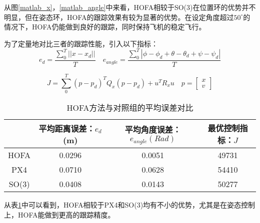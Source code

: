从图\ref{matlab_x}，\ref{matlab_angle}中来看，HOFA相较于SO(3)在位置环的优势并不明显，但在姿态环，HOFA的跟踪效果有较为显著的优势。在设定角度超过$50^\circ$的情况下，HOFA仍能做到良好的跟踪，同时保持飞机的稳定飞行。

  
为了定量地对比三者的跟踪性能，引入以下指标：
  $$e_d=\frac{\sum_0^{T}||x-x_d||}{T} \quad e_{angle}=\frac{\sum_0^{T}|\phi-\phi_d+\theta-\theta_d+\psi-\psi_d|}{T}$$

  $$J=\sum_0^{T}(p-p_d)^T Q_x(p-p_d)+u^T R_x u \quad p=\begin{bmatrix}
    x \\ v
  \end{bmatrix}$$
  \begin{table}[h]
    \centering
    \begin{tabular}{cccc}
        \toprule
        & 平均距离误差：$e_d$ (m)& 平均角度误差：$e_{angle}(Rad)$  & 最优控制指标：$J$ \\
        \midrule
        HOFA & 0.0296 & 0.0051 &49731 \\
        PX4 & 0.0710 & 0.0628 &54410 \\
        SO(3) &0.0408  &0.0143 &50277 \\
        \bottomrule
    \end{tabular}
    \caption{HOFA方法与对照组的平均误差对比}
    \label{matlab对比}
\end{table}

从表\ref{matlab对比}中可以看到，HOFA相较于PX4和SO(3)均有不小的优势，尤其是在姿态控制上，HOFA能做到更高的跟踪精度。

